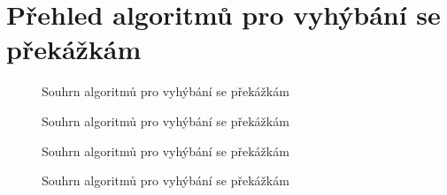 \documentclass[twoside]{ctuthesis}
\theoremstyle{plain}
\theoremstyle{definition}
\theoremstyle{note}
\begin{document}
\chapter{Přehled algoritmů pro vyhýbání se překážkám}
\label{obstacle_avoidance}
\begin{figure}[H]
        \caption{Souhrn algoritmů pro vyhýbání se překážkám \cite[s. 287--290]{cite:20}}
        \label{korelace}
        \newline
\end{figure}
\begin{figure}[H]\ContinuedFloat
                \caption{Souhrn algoritmů pro vyhýbání se překážkám \cite[s. 287--290]{cite:20}}
        \newline
\end{figure}
\begin{figure}[H]\ContinuedFloat
                \caption{Souhrn algoritmů pro vyhýbání se překážkám \cite[s. 287--290]{cite:20}}
        \newline
\end{figure}
\begin{figure}[H]\ContinuedFloat        
        \caption{Souhrn algoritmů pro vyhýbání se překážkám \cite[s. 287--290]{cite:20}}
        \newline
\end{figure}
\fi
\printindex


\end{document}
